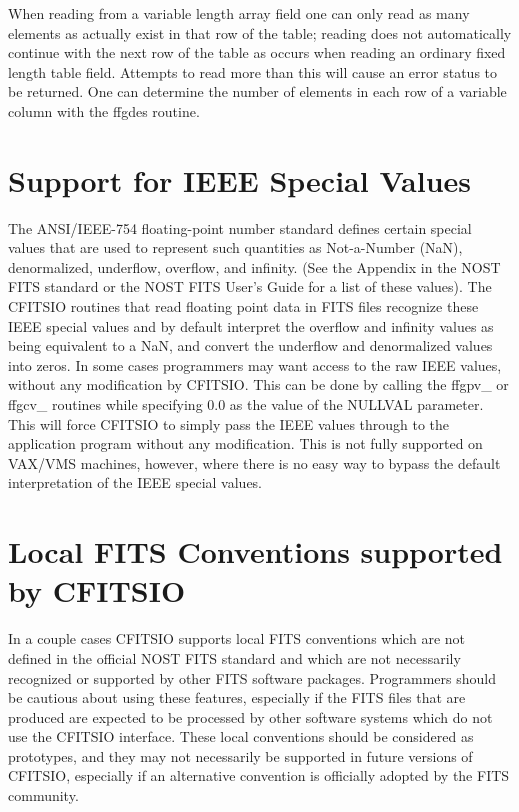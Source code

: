 When reading from a variable length array field one can only read as
many elements as actually exist in that row of the table; reading does
not automatically continue with the next row of the table as occurs
when reading an ordinary fixed length table field.  Attempts to read
more than this will cause an error status to be returned.  One can
determine the number of elements in each row of a variable column with
the ffgdes routine.


\section{Support for IEEE Special Values}

The ANSI/IEEE-754 floating-point number standard defines certain
special values that are used to represent such quantities as
Not-a-Number (NaN), denormalized, underflow, overflow, and infinity.
(See the Appendix in the NOST FITS standard or the NOST FITS User's
Guide for a list of these values).  The CFITSIO routines that read
floating point data in FITS files recognize these IEEE special values
and by default interpret the overflow and infinity values as being
equivalent to a NaN, and convert the underflow and denormalized values
into zeros.  In some cases programmers may want access to the raw IEEE
values, without any modification by CFITSIO.  This can be done by
calling the ffgpv\_ or ffgcv\_ routines while specifying 0.0 as the
value of the NULLVAL parameter.  This will force CFITSIO to simply pass
the IEEE values through to the application program without any
modification.  This is not fully supported on VAX/VMS machines,
however, where there is no easy way to bypass the default
interpretation of the IEEE special values.


\section{Local FITS Conventions supported by CFITSIO}

In a couple cases CFITSIO supports local FITS conventions which are not
defined in the official NOST FITS standard and which are not
necessarily recognized or supported by other FITS software packages.
Programmers should be cautious about using these features, especially
if the FITS files that are produced are expected to be processed by
other software systems which do not use the CFITSIO interface.  These
local conventions should be considered as prototypes, and they may not
necessarily be supported in future versions of CFITSIO, especially if
an alternative convention is officially adopted by the FITS community.


